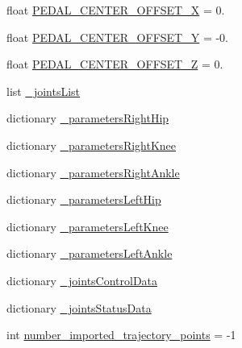 \begin{DoxyCompactItemize}
\item 
float \mbox{\hyperlink{namespacejoint__angle__velocity__factor__test_a0cbc70b3c7851eb11a1027f9796484b6}{P\+E\+D\+A\+L\+\_\+\+C\+E\+N\+T\+E\+R\+\_\+\+O\+F\+F\+S\+E\+T\+\_\+X}} = 0.
\item 
float \mbox{\hyperlink{namespacejoint__angle__velocity__factor__test_abd71da1db22cd5b1876a908e129fe7ec}{P\+E\+D\+A\+L\+\_\+\+C\+E\+N\+T\+E\+R\+\_\+\+O\+F\+F\+S\+E\+T\+\_\+Y}} = -\/0.
\item 
float \mbox{\hyperlink{namespacejoint__angle__velocity__factor__test_a1ebf6fa995c8bc068e696b92cfe18302}{P\+E\+D\+A\+L\+\_\+\+C\+E\+N\+T\+E\+R\+\_\+\+O\+F\+F\+S\+E\+T\+\_\+Z}} = 0.
\item 
list \mbox{\hyperlink{namespacejoint__angle__velocity__factor__test_af67f95a4381bf76f4e732bb3828fab58}{\+\_\+joints\+List}}
\item 
dictionary \mbox{\hyperlink{namespacejoint__angle__velocity__factor__test_a64fe39abe3bfc23f32c4f4c39f5360cd}{\+\_\+parameters\+Right\+Hip}}
\item 
dictionary \mbox{\hyperlink{namespacejoint__angle__velocity__factor__test_aae76810c71676afb68b8bd28da1e2754}{\+\_\+parameters\+Right\+Knee}}
\item 
dictionary \mbox{\hyperlink{namespacejoint__angle__velocity__factor__test_a27327bf70e98f7b92d8743874a1baf64}{\+\_\+parameters\+Right\+Ankle}}
\item 
dictionary \mbox{\hyperlink{namespacejoint__angle__velocity__factor__test_a2c5be5ad02c54578c301c1438501344a}{\+\_\+parameters\+Left\+Hip}}
\item 
dictionary \mbox{\hyperlink{namespacejoint__angle__velocity__factor__test_a8b309d174e32e36154a1c9593eac5ecf}{\+\_\+parameters\+Left\+Knee}}
\item 
dictionary \mbox{\hyperlink{namespacejoint__angle__velocity__factor__test_a5d57a5db9ad64dc001ed11c1466565f0}{\+\_\+parameters\+Left\+Ankle}}
\item 
dictionary \mbox{\hyperlink{namespacejoint__angle__velocity__factor__test_a8085221f9b5a4227f50e66b0ff6eb67b}{\+\_\+joints\+Control\+Data}}
\item 
dictionary \mbox{\hyperlink{namespacejoint__angle__velocity__factor__test_af1d4789fa2edc65558a0ecffbae461af}{\+\_\+joints\+Status\+Data}}
\item 
int \mbox{\hyperlink{namespacejoint__angle__velocity__factor__test_af5d26f808e11fc4c98e64f95ecbfa935}{number\+\_\+imported\+\_\+trajectory\+\_\+points}} = -\/1
\item 

\end{DoxyCompactItemize}
